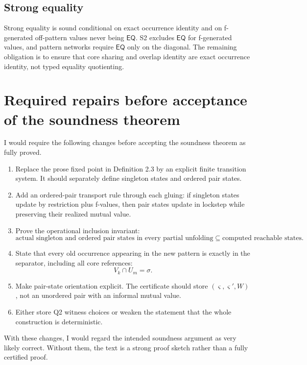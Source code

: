 \documentclass[11pt]{article}
\newcommand{\EQ}{\ensuremath{\mathsf{EQ}}}
\begin{document}
\subsection{Strong equality}
Strong equality is sound conditional on exact occurrence identity and on f-generated off-pattern values never being \EQ{}.  S2 excludes \EQ{} for f-generated values, and pattern networks require \EQ{} only on the diagonal.  The remaining obligation is to ensure that core sharing and overlap identity are exact occurrence identity, not typed equality quotienting.

\section{Required repairs before acceptance of the soundness theorem}

I would require the following changes before accepting the soundness theorem as fully proved.
\begin{enumerate}[label=R\arabic*.]
  \item Replace the prose fixed point in Definition 2.3 by an explicit finite transition system.  It should separately define singleton states and ordered pair states.
  \item Add an ordered-pair transport rule through each gluing: if singleton states update by restriction plus f-values, then pair states update in lockstep while preserving their realized mutual value.
  \item Prove the operational inclusion invariant:
  \[
    \text{actual singleton and ordered pair states in every partial unfolding}
    \subseteq
    \text{computed reachable states}.
  \]
  \item State that every old occurrence appearing in the new pattern is exactly in the separator, including all core references:
  \[
    V_k\cap U_m=\sigma.
  \]
  \item Make pair-state orientation explicit.  The certificate should store \((\varsigma,\varsigma',W)\), not an unordered pair with an informal mutual value.
  \item Either store Q2 witness choices or weaken the statement that the whole construction is deterministic.
\end{enumerate}

With these changes, I would regard the intended soundness argument as very likely correct.  Without them, the text is a strong proof sketch rather than a fully certified proof.

\appendix
\end{document}
